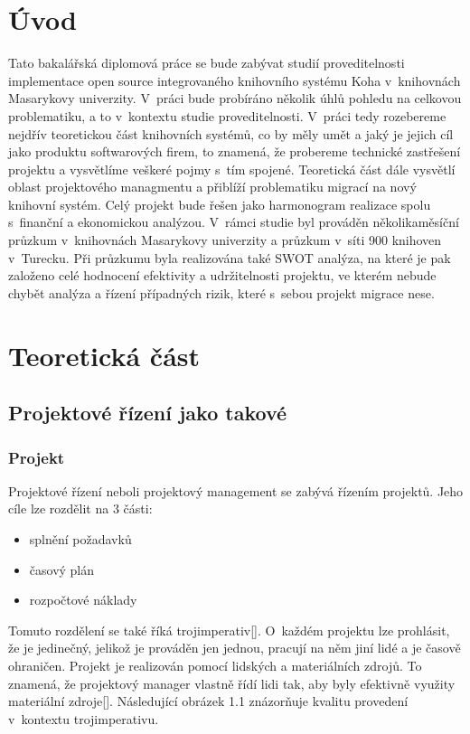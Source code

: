 \documentclass[
	11pt, oneside, printed, draft, 
	table,   %
	lof,     %
	lot     %
]{fithesis3}
\newcommand{\citepages}[2]{[\cite[#1]{#2}]}
\newcommand{\mezera}{\bigskip}
\begin{document}
{%

\chapter*{Úvod}
Tato bakalářská diplomová práce se bude zabývat studií proveditelnosti implementace open source integrovaného knihovního systému Koha v~knihovnách Masarykovy univerzity. V~práci bude probíráno několik úhlů pohledu na celkovou problematiku, a to v~kontextu studie proveditelnosti.  V~práci tedy rozebereme nejdřív teoretickou část knihovních systémů, co by měly umět a jaký je jejich cíl jako produktu softwarových firem, to znamená, že probereme technické zastřešení projektu a vysvětlíme veškeré pojmy s~tím spojené. Teoretická část dále vysvětlí oblast projektového managmentu a přiblíží problematiku migrací na nový knihovní systém. Celý projekt bude řešen jako harmonogram realizace spolu s~finanční a ekonomickou analýzou. V~rámci studie byl prováděn několikaměsíční průzkum v~knihovnách Masarykovy univerzity a průzkum v~síti 900 knihoven v~Turecku. Při průzkumu byla realizována také SWOT analýza, na které je pak založeno celé hodnocení efektivity a udržitelnosti projektu, ve kterém nebude chybět analýza a řízení případných rizik, které s~sebou projekt migrace nese.

\chapter{Teoretická část}

\section{Projektové řízení jako takové}

\subsection{Projekt}

Projektové řízení neboli projektový management se zabývá řízením projektů. Jeho cíle lze rozdělit na 3 části: 
\mezera
\begin{itemize}
\item splnění požadavků
\item časový plán
\item rozpočtové náklady
\end{itemize}

Tomuto rozdělení se také říká trojimperativ\citepages{5}{rosenau_2000}. O~každém projektu lze prohlásit, že je jedinečný, jelikož je prováděn jen jednou, pracují na něm jiní lidé a je časově ohraničen. Projekt je realizován pomocí lidských a materiálních zdrojů. To znamená, že projektový manager vlastně řídí lidi tak, aby byly efektivně využity materiální zdroje\citepages{28}{rehacek_2013}. Následující obrázek 1.1 znázorňuje kvalitu provedení v~kontextu trojimperativu.%

}
\end{document}
